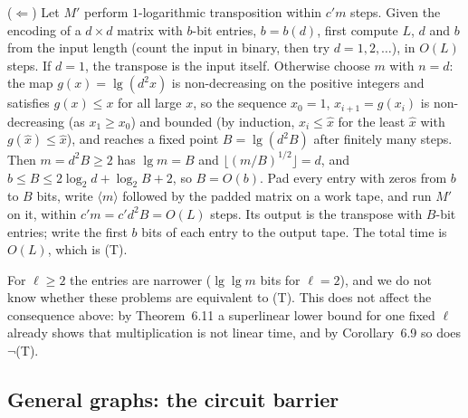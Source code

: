 \begin{informalproof}
($\Leftarrow$) Let $M'$ perform $1$-logarithmic transposition within $c'm$ steps. Given the encoding of a
$d\times d$ matrix with $b$-bit entries, $b=b(d)$, first compute $L$, $d$ and $b$ from the input length
(count the input in binary, then try $d=1,2,\dots$), in $O(L)$ steps. If $d=1$, the transpose is the input itself. Otherwise choose $m$ with $n=d$: the map
$g(x)=\lg(d^2x)$ is non-decreasing on the positive integers and satisfies $g(x)\le x$ for all large $x$, so the sequence $x_0=1$, $x_{i+1}=g(x_i)$ is non-decreasing (as $x_1\ge x_0$) and bounded (by induction, $x_i\le\hat x$ for the least $\hat x$ with $g(\hat x)\le\hat x$), and reaches a fixed point $B=\lg(d^2B)$
after finitely many steps. Then $m=d^2B\ge2$ has $\lg m=B$ and $\lfloor(m/B)^{1/2}\rfloor=d$, and
$b\le B\le2\log_2d+\log_2B+2$, so $B=O(b)$. Pad every entry with zeros from $b$ to $B$ bits, write $\langle m\rangle$ followed by the padded matrix on a work tape, and run $M'$ on it, within $c'm=c'd^2B=O(L)$ steps. Its
output is the transpose with $B$-bit entries; write the first $b$ bits of each entry to the output tape. The
total time is $O(L)$, which is (T).
\end{informalproof}

For $\ell\ge2$ the entries are narrower ($\lg\lg m$ bits for $\ell=2$), and we do not know whether these problems
are equivalent to (T). This does not affect the consequence above: by Theorem~6.11 a superlinear lower bound for one fixed $\ell$ already shows that multiplication is not linear time, and by Corollary~6.9 so does
$\neg$(T).

\subsection{General graphs: the circuit barrier}

